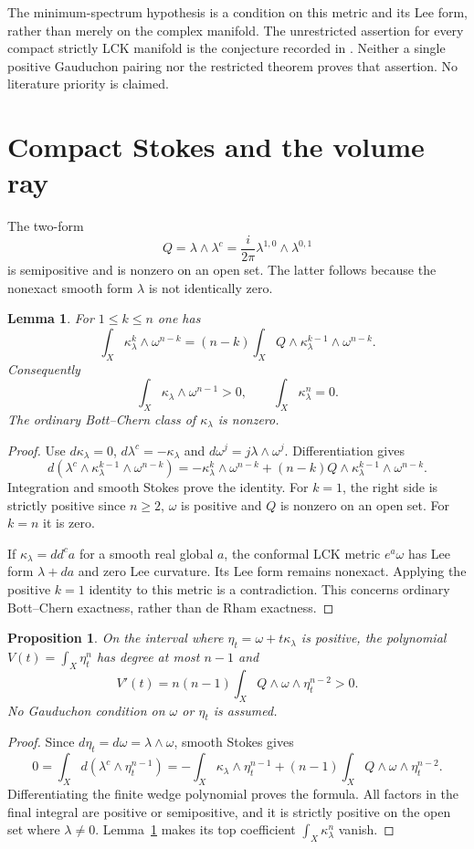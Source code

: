 \documentclass[11pt]{article}
\newcommand{\ddc}{dd^c}
\newcommand{\kap}{\kappa_\lambda}
\newtheorem{proposition}[theorem]{Proposition}
\newtheorem{lemma}[theorem]{Lemma}
\theoremstyle{remark}\newtheorem{remark}[theorem]{Remark}
\begin{document}
The minimum-spectrum hypothesis is a condition on this metric and
its Lee form, rather than merely on the complex manifold. The
unrestricted assertion for every compact strictly LCK manifold is
the conjecture recorded in \cite[Conjecture 5.13]{OV}. Neither a
single positive Gauduchon pairing nor the restricted theorem proves
that assertion. No literature priority is claimed.

\section{Compact Stokes and the volume ray}
The two-form
\[
 Q=\lambda\wedge\lambda^c
   =\frac{i}{2\pi}\lambda^{1,0}\wedge\lambda^{0,1}
\]
is semipositive and is nonzero on an open set. The latter follows
because the nonexact smooth form $\lambda$ is not identically zero.

\begin{lemma}\label{lem:stokes}
For $1\leq k\leq n$ one has
\[
 \int_X\kap^k\wedge\omega^{n-k}
  =(n-k)\int_X Q\wedge\kap^{k-1}\wedge\omega^{n-k}.
\]
Consequently
\[
 \int_X\kap\wedge\omega^{n-1}>0,\qquad
 \int_X\kap^n=0.
\]
The ordinary Bott--Chern class of $\kap$ is nonzero.
\end{lemma}
\begin{proof}
Use $d\kap=0$, $d\lambda^c=-\kap$ and
$d\omega^j=j\lambda\wedge\omega^j$. Differentiation gives
\[
 d(\lambda^c\wedge\kap^{k-1}\wedge\omega^{n-k})
 =-\kap^k\wedge\omega^{n-k}
   +(n-k)Q\wedge\kap^{k-1}\wedge\omega^{n-k}.
\]
Integration and smooth Stokes prove the identity. For $k=1$, the
right side is strictly positive since $n\geq2$, $\omega$ is positive
and $Q$ is nonzero on an open set. For $k=n$ it is zero.

If $\kap=\ddc a$ for a smooth real global $a$, the conformal LCK
metric $e^a\omega$ has Lee form $\lambda+da$ and zero Lee curvature.
Its Lee form remains nonexact. Applying the positive $k=1$ identity
to this metric is a contradiction. This concerns ordinary
Bott--Chern exactness, rather than de Rham exactness.
\end{proof}

\begin{proposition}\label{prop:ray}
On the interval where $\eta_t=\omega+t\kap$ is positive, the
polynomial $V(t)=\int_X\eta_t^n$ has degree at most $n-1$ and
\[
 V'(t)=n(n-1)\int_X Q\wedge\omega\wedge\eta_t^{n-2}>0.
\]
No Gauduchon condition on $\omega$ or $\eta_t$ is assumed.
\end{proposition}
\begin{proof}
Since $d\eta_t=d\omega=\lambda\wedge\omega$, smooth Stokes gives
\[
 0=\int_X d(\lambda^c\wedge\eta_t^{n-1})
  =-\int_X\kap\wedge\eta_t^{n-1}
    +(n-1)\int_X Q\wedge\omega\wedge\eta_t^{n-2}.
\]
Differentiating the finite wedge polynomial proves the formula.
All factors in the final integral are positive or semipositive,
and it is strictly positive on the open set where $\lambda\ne0$.
Lemma~\ref{lem:stokes} makes its top coefficient
$\int_X\kap^n$ vanish.
\end{proof}
\end{document}
